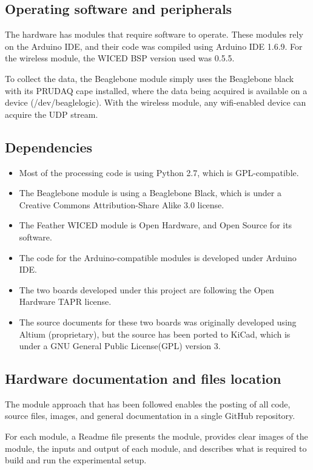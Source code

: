 \documentclass[letterpaper, 10 pt, conference]{ieeeconf} %
\begin{document}
\subsection{ Operating software and peripherals}

The hardware has modules that require software to operate. These modules rely on the Arduino IDE, and their code was compiled using Arduino IDE 1.6.9. For the wireless module, the WICED BSP version used was 0.5.5.

To collect the data, the Beaglebone module simply uses the Beaglebone black with its PRUDAQ cape installed, where the data being acquired is available on a device (/dev/beaglelogic). With the wireless module, any wifi-enabled device can acquire the UDP stream. 

\subsection{Dependencies}

\begin{itemize}

\item Most of the processing code is using Python 2.7, which is GPL-compatible.
\item The Beaglebone module is using a Beaglebone Black, which is under a Creative Commons Attribution-Share Alike 3.0 license.
\item The Feather WICED module is Open Hardware, and Open Source for its software.
\item The code for the Arduino-compatible modules is developed under Arduino IDE.
\item The two boards developed under this project are following the Open Hardware TAPR license. 
\item The source documents for these two boards was originally developed using Altium (proprietary), but the source has been ported to KiCad, which is under a GNU General Public License(GPL) version 3.
\end{itemize}

\subsection{Hardware documentation and files location} 

The module approach that has been followed enables the posting of all code, source files, images, and general documentation in a single GitHub repository.

For each module, a Readme file presents the module, provides clear images of the module, the inputs and output of each module, and describes what is required to build and run the experimental setup.
\end{document}
